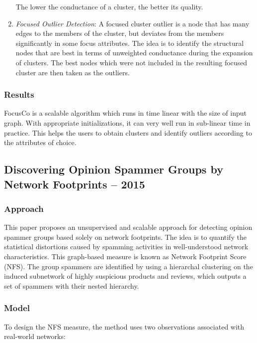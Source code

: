 \documentclass[11pt, oneside]{article}   	%
\begin{document}
\begin{enumerate}
The lower the conductance of a cluster, the better its quality.

\item \emph{Focused Outlier Detection}:
A focused cluster outlier is a node that has many edges to the members of the cluster, but deviates from the members significantly in some focus attributes.
The idea is to identify the structural nodes that are best in terms of unweighted conductance during the expansion of clusters.
The best nodes which were not included in the resulting focused cluster are then taken as the outliers.
\end{enumerate}

\subsubsection*{Results}

\quad FocusCo is a scalable algorithm which runs in time linear with the size of input graph.
With appropriate initializations, it can very well run in sub-linear time in practice.
This helps the users to obtain clusters and identify outliers according to the attributes of choice.

\subsection*{Discovering Opinion Spammer Groups by Network Footprints -- 2015}

\subsubsection*{Approach}

\quad This paper proposes an unsupervised and scalable approach for detecting opinion spammer groups based solely on network footprints.
The idea is to quantify the statistical distortions caused by spamming activities in well-understood network characteristics.
This graph-based measure is known as Network Footprint Score (NFS).
The group spammers are identified by using a hierarchal clustering on the induced subnetwork of highly suspicious products and reviews, which outputs a set of spammers with their nested hierarchy.

\subsubsection*{Model}

To design the NFS measure, the method uses two observations associated with real-world networks:
\end{document}
